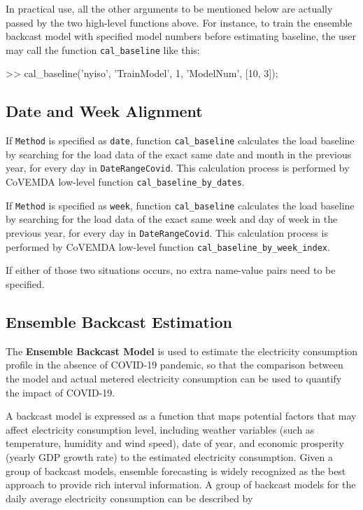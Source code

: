 \documentclass[11pt]{article}
\newcommand{\covemda}{CoVEMDA}
\numberwithin{equation}{section}
\numberwithin{table}{section}
\numberwithin{figure}{section}
\begin{document}
In practical use, all the other arguments to be mentioned below are actually passed by the two high-level functions above. For instance, to train the ensemble backcast model with specified model numbers before estimating baseline, the user may call the function \verb!cal_baseline! like this:

\begin{Code}
>> cal_baseline('nyiso', 'TrainModel', 1, 'ModelNum', [10, 3]);
\end{Code}

\subsection{Date and Week Alignment}



If \verb!Method! is specified as \verb!date!, function \verb!cal_baseline! calculates the load baseline by searching for the load data of the exact same date and month in the previous year, for every day in \verb!DateRangeCovid!. This calculation process is performed by \covemda{} low-level function \verb!cal_baseline_by_dates!.

If \verb!Method! is specified as \verb!week!, function \verb!cal_baseline! calculates the load baseline by searching for the load data of the exact same week and day of week in the previous year, for every day in \verb!DateRangeCovid!. This calculation process is performed by \covemda{} low-level function \verb!cal_baseline_by_week_index!.

If either of those two situations occurs, no extra name-value pairs need to be specified.



\subsection{Ensemble Backcast Estimation}
The \textbf{Ensemble Backcast Model} is used to estimate the electricity consumption profile in the absence of COVID-19 pandemic, so that the comparison between the model and actual metered electricity consumption can be used to quantify the impact of COVID-19.

A backcast model is expressed as a function that maps potential factors that may affect electricity consumption level, including weather variables (such as temperature, humidity and wind speed), date of year, and economic prosperity (yearly GDP growth rate) to the estimated electricity consumption. Given a group of backcast models, ensemble forecasting is widely recognized as the best approach to provide rich interval information. A group of backcast models for the daily average electricity consumption can be described by
\end{document}
